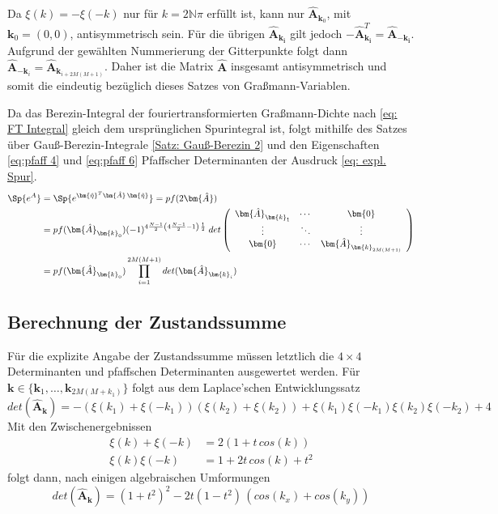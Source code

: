 \noindent Da $\xi(k) = - \xi(-k)  $ nur für $k = 2\mathbb{N}\pi$ erfüllt ist, kann nur  $\bm{\hat{A}}_{\bm{k}_0}$, mit ${\bm{k}_0} = (0,0)$, antisymmetrisch sein. Für die übrigen $\bm{\hat{A}}_{\bm{k_i}}$ gilt jedoch $-\bm{\hat{A}}_{\bm{k_i}}^T = \bm{\hat{A}}_{-\bm{k_i}}$. Aufgrund der gewählten Nummerierung der Gitterpunkte folgt dann $\bm{\hat{A}}_{-\bm{k}_i} = \bm{\hat{A}}_{\bm{k}_{i+2M(M+1)}}$. 
Daher ist die Matrix $\hat{\bm{A}}$ insgesamt antisymmetrisch und somit die eindeutig bezüglich dieses Satzes von Graßmann-Variablen. 

\noindent Da das Berezin-Integral der fouriertransformierten Graßmann-Dichte nach \eqref{eq: FT Integral} gleich dem ursprünglichen Spurintegral ist, folgt mithilfe des Satzes über Gauß-Berezin-Integrale \eqref{Satz: Gauß-Berezin 2} und den Eigenschaften \eqref{eq:pfaff 4} und \eqref{eq:pfaff 6} Pfaffscher Determinanten der Ausdruck \eqref{eq: expl. Spur}.
\begin{align}
\Sp{e^{A}}
    &= \Sp{e^{\bm{\hat{\eta}}^T \bm{\hat{A}} \,\bm{\hat{\eta}}}} 
    = pf(2\bm{\hat{A}}) \nonumber \\
    &= pf(\bm{\hat{A}}_{\bm{k}_0}) (-1)^{4\frac{N-1}{2} \left(4\frac{N-1}{2}-1 \right) \, \frac{1}{2}}
        \; det\left(\begin{array}{ccc}  
        \bm{\hat{A}}_{\bm{k}_1} & \cdots  & \bm{0} \\
        \vdots                  & \ddots  & \vdots \\
        \bm{0}                  & \cdots  & \bm{\hat{A}}_{\bm{k}_{2M(M+1)}} 
        \end{array} \right)  \nonumber \\
    &= pf(\bm{\hat{A}}_{\bm{k}_0}) \prod_{i = 1}^{2M(M+1)}  det(\bm{\hat{A}}_{\bm{k}_i}) \label{eq: expl. Spur}
\end{align}

\subsection{Berechnung der Zustandssumme} 

Für die explizite Angabe der Zustandssumme müssen letztlich die $4\times4$ Determinanten und pfaffschen Determinanten ausgewertet werden. Für $ \bm{k} \in \{ \bm{k}_1,\dots, \bm{k}_{2M(M+k_1)} \} $ folgt aus dem Laplace'schen Entwicklungssatz
\begin{equation} \nonumber
det(\bm{\hat{A}}_{\bm{k}})
    = -(\xi(k_1)+\xi(-k_1))(\xi(k_2)+\xi(k_2)) +  \xi(k_1)\xi(-k_1)\xi(k_2)\xi(-k_2) + 4 
\end{equation} Mit den Zwischenergebnissen
\begin{align} \nonumber
\xi(k)+\xi(-k) &= 2(1 + t\,cos(k)) \nonumber \\
\xi(k)\xi(-k) &= 1 + 2t\,cos(k) + t^2 \nonumber
\end{align} folgt dann, nach einigen algebraischen Umformungen
\begin{equation} \label{eq: expl. det(A_k)}
det(\bm{\hat{A}}_{\bm{k}})
    = (1+t^2)^2 - 2t(1-t^2)\,(cos(k_x) + cos(k_y))
\end{equation}

